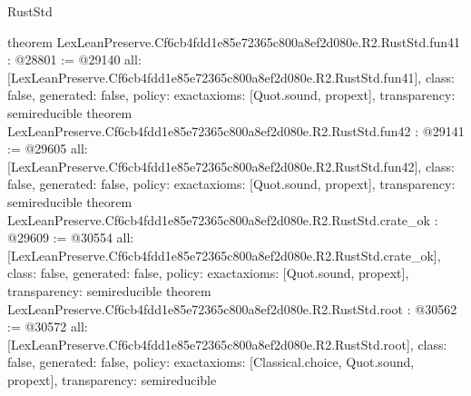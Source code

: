 \begin{lexlean}{RustStd}
\begin{coremodule}
{}
theorem LexLeanPreserve.Cf6cb4fdd1e85e72365c800a8ef2d080e.R2.RustStd.fun41 : @28801 := @29140 {
  all: [LexLeanPreserve.Cf6cb4fdd1e85e72365c800a8ef2d080e.R2.RustStd.fun41],
  class: false,
  generated: false,
  policy: exact{axioms: [Quot.sound, propext]},
  transparency: semireducible
}
theorem LexLeanPreserve.Cf6cb4fdd1e85e72365c800a8ef2d080e.R2.RustStd.fun42 : @29141 := @29605 {
  all: [LexLeanPreserve.Cf6cb4fdd1e85e72365c800a8ef2d080e.R2.RustStd.fun42],
  class: false,
  generated: false,
  policy: exact{axioms: [Quot.sound, propext]},
  transparency: semireducible
}
theorem LexLeanPreserve.Cf6cb4fdd1e85e72365c800a8ef2d080e.R2.RustStd.crate_ok : @29609 := @30554 {
  all: [LexLeanPreserve.Cf6cb4fdd1e85e72365c800a8ef2d080e.R2.RustStd.crate_ok],
  class: false,
  generated: false,
  policy: exact{axioms: [Quot.sound, propext]},
  transparency: semireducible
}
theorem LexLeanPreserve.Cf6cb4fdd1e85e72365c800a8ef2d080e.R2.RustStd.root : @30562 := @30572 {
  all: [LexLeanPreserve.Cf6cb4fdd1e85e72365c800a8ef2d080e.R2.RustStd.root],
  class: false,
  generated: false,
  policy: exact{axioms: [Classical.choice, Quot.sound, propext]},
  transparency: semireducible
}


\end{coremodule}
\end{lexlean}
